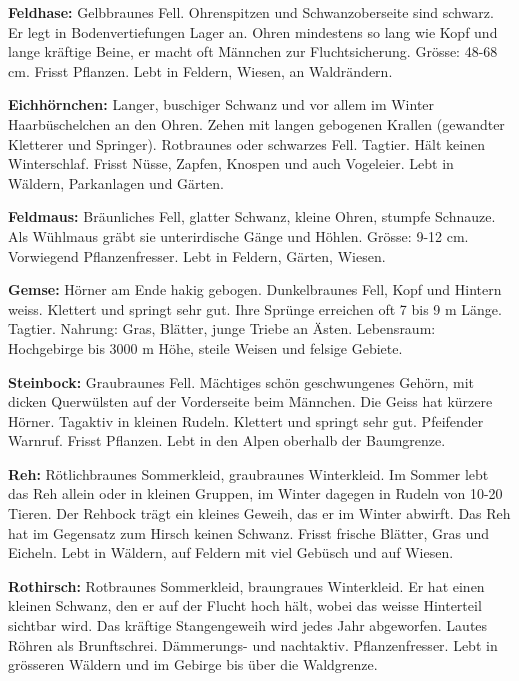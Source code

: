 \textbf{Feldhase: }Gelbbraunes Fell. Ohrenspitzen und Schwanzoberseite sind schwarz. Er legt in Bodenvertiefungen Lager an. Ohren mindestens so lang wie Kopf und lange kräftige Beine, er macht oft Männchen zur Fluchtsicherung. Grösse: 48-68 cm. Frisst Pflanzen. Lebt in Feldern, Wiesen, an Waldrändern.\par

\textbf{Eichhörnchen: }Langer, buschiger Schwanz und vor allem im Winter Haarbüschelchen an den Ohren. Zehen mit langen gebogenen Krallen (gewandter Kletterer und Springer). Rotbraunes oder schwarzes Fell. Tagtier. Hält keinen Winterschlaf. Frisst Nüsse, Zapfen, Knospen und auch Vogeleier. Lebt in Wäldern, Parkanlagen und Gärten.\par

\textbf{Feldmaus: }Bräunliches Fell, glatter Schwanz, kleine Ohren, stumpfe Schnauze. Als Wühlmaus gräbt sie unterirdische Gänge und Höhlen. Grösse: 9-12 cm. Vorwiegend Pflanzenfresser. Lebt in Feldern, Gärten, Wiesen.\par

\textbf{Gemse: }Hörner am Ende hakig gebogen. Dunkelbraunes Fell, Kopf und Hintern weiss. Klettert und springt sehr gut. Ihre Sprünge erreichen oft 7 bis 9 m Länge. Tagtier. Nahrung: Gras, Blätter, junge Triebe an Ästen. Lebensraum: Hochgebirge bis 3000 m Höhe, steile Weisen und felsige Gebiete.\par

\textbf{Steinbock: }Graubraunes Fell. Mächtiges schön geschwungenes Gehörn, mit dicken Querwülsten auf der Vorderseite beim Männchen. Die Geiss hat kürzere Hörner. Tagaktiv in kleinen Rudeln. Klettert und springt sehr gut. Pfeifender Warnruf. Frisst Pflanzen. Lebt in den Alpen oberhalb der Baumgrenze.\par

\textbf{Reh: }Rötlichbraunes Sommerkleid, graubraunes Winterkleid. Im Sommer lebt das Reh allein oder in kleinen Gruppen, im Winter dagegen in Rudeln von 10-20 Tieren. Der Rehbock trägt ein kleines Geweih, das er im Winter abwirft. Das Reh hat im Gegensatz zum Hirsch keinen Schwanz. Frisst frische Blätter, Gras und Eicheln. Lebt in Wäldern, auf Feldern mit viel Gebüsch und auf Wiesen.\par

\textbf{Rothirsch: }Rotbraunes Sommerkleid, braungraues Winterkleid. Er hat einen kleinen Schwanz, den er auf der Flucht hoch hält, wobei das weisse Hinterteil sichtbar wird. Das kräftige Stangengeweih wird jedes Jahr abgeworfen. Lautes Röhren als Brunftschrei. Dämmerungs- und nachtaktiv. Pflanzenfresser. Lebt in grösseren Wäldern und im Gebirge bis über die Waldgrenze.\par

